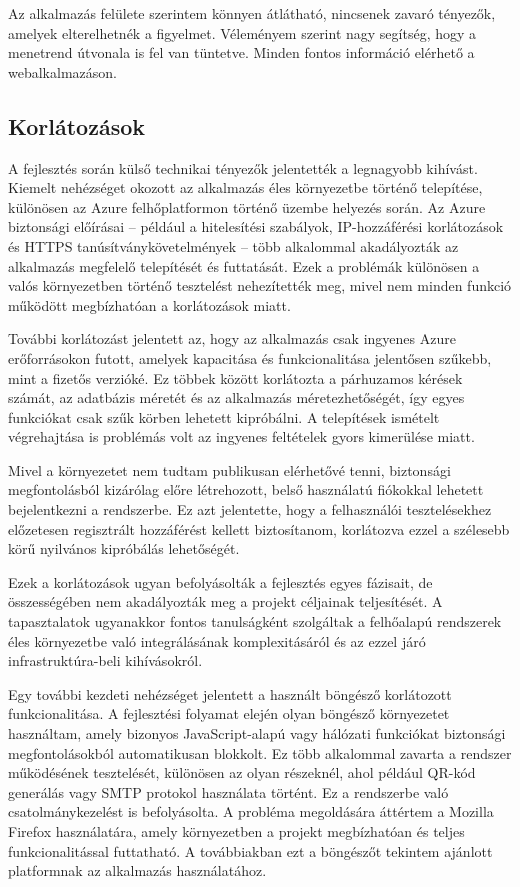 Az alkalmazás felülete szerintem könnyen átlátható, nincsenek zavaró tényezők, amelyek elterelhetnék a figyelmet. Véleményem szerint nagy segítség, hogy a menetrend útvonala is fel van tüntetve. Minden fontos információ elérhető a webalkalmazáson.

\subsection{Korlátozások}

A fejlesztés során külső technikai tényezők jelentették a legnagyobb kihívást. Kiemelt nehézséget okozott az alkalmazás éles környezetbe történő telepítése, különösen az Azure felhőplatformon történő üzembe helyezés során. Az Azure biztonsági előírásai – például a hitelesítési szabályok, IP-hozzáférési korlátozások és HTTPS tanúsítványkövetelmények – több alkalommal akadályozták az alkalmazás megfelelő telepítését és futtatását. Ezek a problémák különösen a valós környezetben történő tesztelést nehezítették meg, mivel nem minden funkció működött megbízhatóan a korlátozások miatt.

További korlátozást jelentett az, hogy az alkalmazás csak ingyenes Azure erőforrásokon futott, amelyek kapacitása és funkcionalitása jelentősen szűkebb, mint a fizetős verzióké. Ez többek között korlátozta a párhuzamos kérések számát, az adatbázis méretét és az alkalmazás méretezhetőségét, így egyes funkciókat csak szűk körben lehetett kipróbálni. A telepítések ismételt végrehajtása is problémás volt az ingyenes feltételek gyors kimerülése miatt.

Mivel a környezetet nem tudtam publikusan elérhetővé tenni, biztonsági megfontolásból kizárólag előre létrehozott, belső használatú fiókokkal lehetett bejelentkezni a rendszerbe. Ez azt jelentette, hogy a felhasználói tesztelésekhez előzetesen regisztrált hozzáférést kellett biztosítanom, korlátozva ezzel a szélesebb körű nyilvános kipróbálás lehetőségét.

Ezek a korlátozások ugyan befolyásolták a fejlesztés egyes fázisait, de összességében nem akadályozták meg a projekt céljainak teljesítését. A tapasztalatok ugyanakkor fontos tanulságként szolgáltak a felhőalapú rendszerek éles környezetbe való integrálásának komplexitásáról és az ezzel járó infrastruktúra-beli kihívásokról.

Egy további kezdeti nehézséget jelentett a használt böngésző korlátozott funkcionalitása. A fejlesztési folyamat elején olyan böngésző környezetet használtam, amely bizonyos JavaScript-alapú vagy hálózati funkciókat biztonsági megfontolásokból automatikusan blokkolt. Ez több alkalommal zavarta a rendszer működésének tesztelését, különösen az olyan részeknél, ahol például QR-kód generálás vagy SMTP protokol használata történt. Ez a rendszerbe való csatolmánykezelést is befolyásolta. A probléma megoldására áttértem a Mozilla Firefox használatára, amely környezetben a projekt megbízhatóan és teljes funkcionalitással futtatható. A továbbiakban ezt a böngészőt tekintem ajánlott platformnak az alkalmazás használatához.


